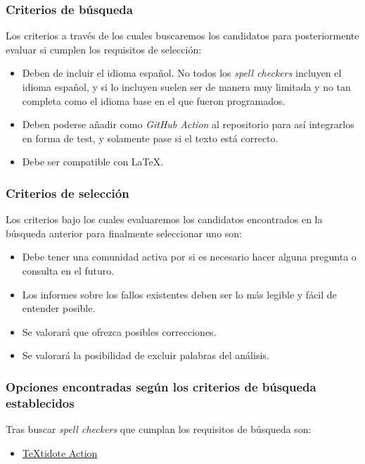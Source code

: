 \subsubsection{Criterios de búsqueda}

Los criterios a través de los cuales buscaremos los candidatos para
posteriormente evaluar si cumplen los requisitos de selección:
\begin{itemize}
    \item Deben de incluir el idioma español. No todos los \emph{spell checkers}
    incluyen el idioma español, y si lo incluyen suelen ser de manera muy
    limitada y no tan completa como el idioma base en el que fueron programados.
    \item Deben poderse añadir como \emph{GitHub Action} al repositorio para así
    integrarlos en forma de test, y solamente pase si el texto está correcto.
    \item Debe ser compatible con LaTeX.
\end{itemize}

\subsubsection{Criterios de selección}

Los criterios bajo los cuales evaluaremos los candidatos encontrados en la
búsqueda anterior para finalmente seleccionar uno son:
\begin{itemize}
    \item Debe tener una comunidad activa por si es necesario hacer alguna
    pregunta o consulta en el futuro.
    \item Los informes sobre los fallos existentes deben ser lo más legible y
    fácil de entender posible.
    \item Se valorará que ofrezca posibles correcciones.
    \item Se valorará la posibilidad de excluir palabras del análisis. 

\end{itemize}


\subsubsection{Opciones encontradas según los criterios de búsqueda establecidos}

Tras buscar \emph{spell checkers} que cumplan los requisitos de búsqueda son:

\begin{itemize}
    \item \href{https://github.com/marketplace/actions/textidote-action}{TeXtidote Action}
\end{itemize}

